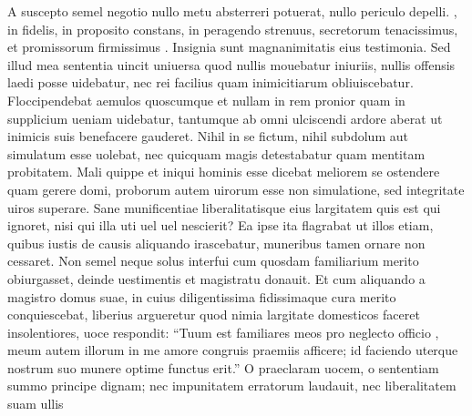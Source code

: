 \documentclass[a5paper,twoside]{article}
\begin{document}

\begin{pages}

\begin{Leftside}

\beginnumbering
\numberlinetrue
\numberpstarttrue

\setcounter{pstart}{1}

\pstart
A suscepto semel negotio nullo metu absterreri potuerat, nullo periculo depelli. , in  fidelis, in proposito constans, in peragendo strenuus, secretorum tenacissimus, et promissorum firmissimus . Insignia  sunt magnanimitatis eius testimonia.  Sed illud mea sententia uincit uniuersa quod nullis mouebatur iniuriis, nullis offensis laedi posse uidebatur, nec  rei facilius quam inimicitiarum obliuiscebatur. Floccipendebat aemulos quoscumque et nullam in rem pronior quam in supplicium ueniam uidebatur, tantumque ab omni ulciscendi ardore aberat ut inimicis suis benefacere gauderet. Nihil in se fictum, nihil subdolum aut simulatum esse uolebat, nec quicquam magis detestabatur quam mentitam probitatem. Mali quippe et iniqui hominis esse dicebat meliorem se  ostendere quam gerere domi, proborum autem uirorum esse non simulatione, sed integritate uiros superare. Sane munificentiae liberalitatisque eius largitatem quis est qui ignoret, nisi qui illa uti uel  uel nescierit? Ea ipse ita flagrabat ut illos etiam, quibus iustis de causis aliquando irascebatur, muneribus tamen ornare non cessaret. Non semel neque solus interfui cum quosdam familiarium merito obiurgasset, deinde uestimentis et magistratu donauit. Et cum aliquando a magistro domus suae, in cuius diligentissima fidissimaque cura merito conquiescebat, liberius argueretur quod nimia  largitate domesticos faceret insolentiores,  uoce respondit: ``Tuum est familiares meos pro neglecto officio , meum autem  illorum in me amore congruis praemiis afficere; id faciendo uterque nostrum suo munere optime functus erit.'' O praeclaram uocem, o sententiam summo principe dignam; nec impunitatem erratorum laudauit, nec liberalitatem suam ullis 
\end{Leftside}
\end{pages}
\end{document}
